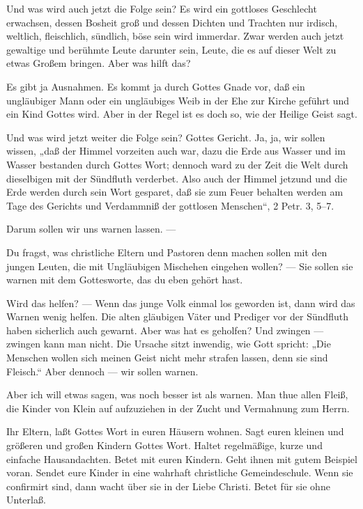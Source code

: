 Und was wird auch jetzt die Folge sein? Es wird ein gottloses Geschlecht erwachsen, dessen Bosheit groß und dessen Dichten und Trachten nur irdisch, weltlich, fleischlich, sündlich, böse sein wird immerdar. Zwar werden auch jetzt gewaltige und berühmte Leute darunter sein, Leute, die es auf dieser Welt zu etwas Großem bringen. Aber was hilft das?

Es gibt ja Ausnahmen. Es kommt ja durch Gottes Gnade vor, daß ein ungläubiger Mann oder ein ungläubiges Weib in der Ehe zur Kirche geführt und ein Kind Gottes wird. Aber in der Regel ist es doch so, wie der Heilige Geist sagt.

Und was wird jetzt weiter die Folge sein? Gottes Gericht. Ja, ja, wir sollen wissen, „daß der Himmel vorzeiten auch war, dazu die Erde aus Wasser und im Wasser bestanden durch Gottes Wort; dennoch ward zu der Zeit die Welt durch dieselbigen mit der Sündfluth verderbet. Also auch der Himmel jetzund und die Erde werden durch sein Wort gesparet, daß sie zum Feuer behalten werden am Tage des Gerichts und Verdammniß der gottlosen Menschen“, 2 Petr. 3, 5–7.

Darum sollen wir uns warnen lassen. —

Du fragst, was christliche Eltern und Pastoren denn machen sollen mit den jungen Leuten, die mit Ungläubigen Mischehen eingehen wollen? — Sie sollen sie warnen mit dem Gottesworte, das du eben gehört hast.


Wird das helfen? — Wenn das junge Volk einmal los geworden ist, dann wird das Warnen wenig helfen. Die alten gläubigen Väter und Prediger vor der Sündfluth haben sicherlich auch gewarnt. Aber was hat es geholfen? Und zwingen — zwingen kann man nicht. Die Ursache sitzt inwendig, wie Gott spricht: „Die Menschen wollen sich meinen Geist nicht mehr strafen lassen, denn sie sind Fleisch.“ Aber dennoch — wir sollen warnen.

Aber ich will etwas sagen, was noch besser ist als warnen. Man thue allen Fleiß, die Kinder von Klein auf aufzuziehen in der Zucht und Vermahnung zum Herrn.

Ihr Eltern, laßt Gottes Wort in euren Häusern wohnen. Sagt euren kleinen und größeren und großen Kindern Gottes Wort. Haltet regelmäßige, kurze und einfache Hausandachten. Betet mit euren Kindern. Geht ihnen mit gutem Beispiel voran. Sendet eure Kinder in eine wahrhaft christliche Gemeindeschule. Wenn sie confirmirt sind, dann wacht über sie in der Liebe Christi. Betet für sie ohne Unterlaß.

